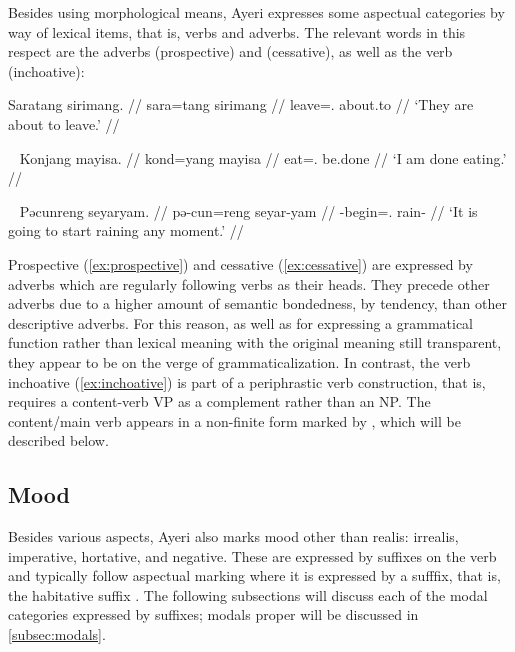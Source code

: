 Besides using morphological means, Ayeri expresses some aspectual categories by
way of lexical items, that is, verbs and adverbs. The relevant words in this
respect are the adverbs  (prospective) and
 (cessative), as well as 
the verb  (inchoative):

\ex\label{ex:prospective}\begingl
	\gla Saratang sirimang. //
	\glb sara=tang sirimang //
	\glc leave=\TplM{}.\Aarg{} about.to //
	\glft `They are about to leave.' //
\endgl\xe

\ex~\label{ex:cessative}\begingl
	\gla Konjang mayisa. //
	\glb kond=yang mayisa //
	\glc eat=\Fsg.\Aarg{} be.done //
	\glft `I am done eating.' //
\endgl\xe

\ex~\label{ex:inchoative}\begingl
	\gla Pəcunreng seyaryam. //
	\glb pə-cun=reng seyar-yam //
	\glc \NFut{}-begin=\TsgI{}.\Aarg{} rain-\Ptcp{} //
	\glft `It is going to start raining any moment.' //
\endgl\xe

Prospective  (\ref{ex:prospective}) and cessative
 (\ref{ex:cessative}) are expressed by adverbs which are
regularly following verbs as their heads. They precede other adverbs due to a
higher amount of semantic bondedness, by tendency, than other descriptive
adverbs. For this reason, as well as for expressing a grammatical function rather
than lexical meaning with the original meaning still transparent, they appear
to be on the verge of grammaticalization. In contrast, the verb inchoative 
 (\ref{ex:inchoative}) is part of a periphrastic verb 
construction, that is,  requires a content-verb VP as a 
complement rather than an NP. The content/main verb appears in a non-finite 
form marked by , which will be described below.

\subsection{Mood}
\label{subsec:mood}

Besides various aspects, Ayeri also marks mood other than realis: irrealis,
imperative, hortative, and negative. These are expressed by suffixes on
the verb and typically follow aspectual marking where it is expressed by a
sufffix, that is, the habitative suffix . The following
subsections will discuss each of the modal categories expressed by suffixes;
modals proper will be discussed in \autoref{subsec:modals}.

